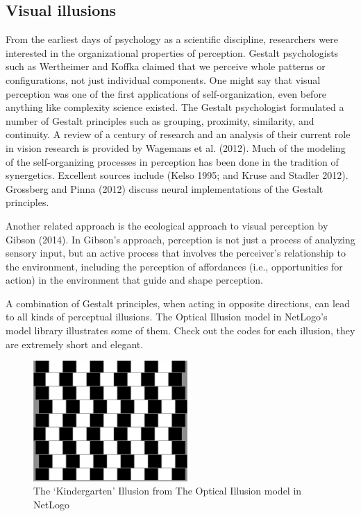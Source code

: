 \documentclass[
  letterpaper,
]{scrbook}
\begin{document}
\hypertarget{visual-illusions}{%
\subsection{Visual illusions}\label{visual-illusions}}

From the earliest days of psychology as a scientific discipline,
researchers were interested in the organizational properties of
perception. Gestalt psychologists such as Wertheimer and Koffka claimed
that we perceive whole patterns or configurations, not just individual
components. One might say that visual perception was one of the first
applications of self-organization, even before anything like complexity
science existed. The Gestalt psychologist formulated a number of Gestalt
principles such as grouping, proximity, similarity, and continuity. A
review of a century of research and an analysis of their current role in
vision research is provided by Wagemans et al. (2012). Much of the
modeling of the self-organizing processes in perception has been done in
the tradition of synergetics. Excellent sources include (Kelso 1995; and
Kruse and Stadler 2012). Grossberg and Pinna (2012) discuss neural
implementations of the Gestalt principles.

Another related approach is the ecological approach to visual perception
by Gibson (2014). In Gibson's approach, perception is not just a process
of analyzing sensory input, but an active process that involves the
perceiver's relationship to the environment, including the perception of
affordances (i.e., opportunities for action) in the environment that
guide and shape perception.

A combination of Gestalt principles, when acting in opposite directions,
can lead to all kinds of perceptual illusions. The Optical Illusion
model in NetLogo's model library illustrates some of them. Check out the
codes for each illusion, they are extremely short and elegant.

\begin{figure}

{\centering \includegraphics[width=2.30901in,height=1.80727in]{media/ch4/image6.jpg}

}

\caption{\label{fig-ch4-img6}The `Kindergarten' Illusion from The
Optical Illusion model in NetLogo}

\end{figure}
\end{document}
